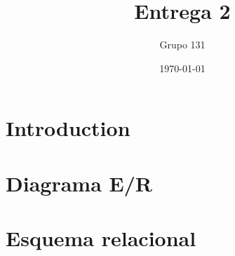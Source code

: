 \documentclass{article}
\title{Entrega 2}
\author{Grupo 131}
\date{\today}
\begin{document}
\maketitle

\section{Introduction}

\section{Diagrama E/R}

\section{Esquema relacional}
\end{document}
